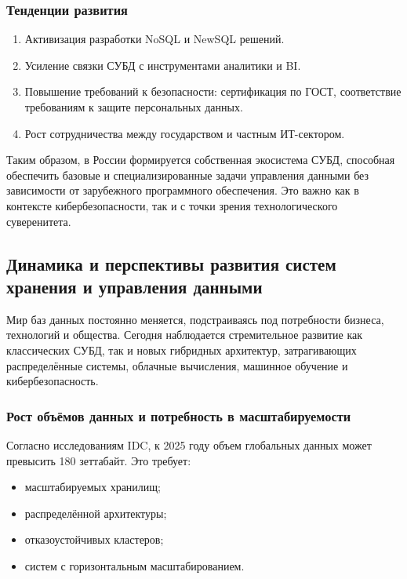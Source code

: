 \subsubsection{Тенденции развития}

\begin{enumerate}
	\item Активизация разработки NoSQL и NewSQL решений.
	\item Усиление связки СУБД с инструментами аналитики и BI.
	\item Повышение требований к безопасности: сертификация по ГОСТ, соответствие требованиям к защите персональных данных.
	\item Рост сотрудничества между государством и частным ИТ-сектором.	
\end{enumerate}

Таким образом, в России формируется собственная экосистема СУБД, способная обеспечить базовые и специализированные задачи управления данными без зависимости от зарубежного программного обеспечения. Это важно как в контексте кибербезопасности, так и с точки зрения технологического суверенитета.

\subsection{Динамика и перспективы развития систем хранения и управления данными}

Мир баз данных постоянно меняется, подстраиваясь под потребности бизнеса, технологий и общества. Сегодня наблюдается стремительное развитие как классических СУБД, так и новых гибридных архитектур, затрагивающих распределённые системы, облачные вычисления, машинное обучение и кибербезопасность.

\subsubsection{Рост объёмов данных и потребность в масштабируемости}

Согласно исследованиям IDC, к 2025 году объем глобальных данных может превысить 180 зеттабайт. Это требует:
\begin{itemize}
	\item масштабируемых хранилищ;
	\item распределённой архитектуры;
	\item отказоустойчивых кластеров;
	\item систем с горизонтальным масштабированием.
\end{itemize}


